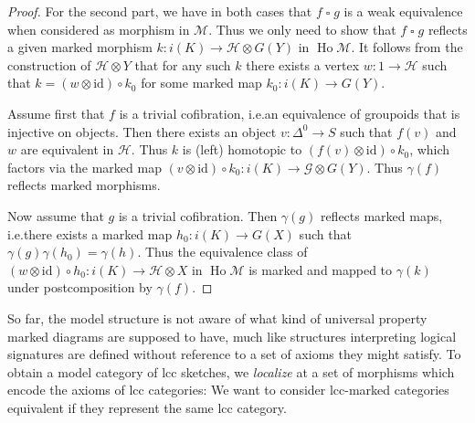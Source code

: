 \documentclass{article}
\theoremstyle{remark}
\theoremstyle{definition}
\begin{document}
\begin{proof}
  For the second part, we have in both cases that $f \mathbin{\square} g$ is a weak equivalence when considered as morphism in $\mathcal{M}$.
  Thus we only need to show that $f \mathbin{\square} g$ reflects a given marked morphism $k : i(K) \rightarrow \mathcal{H} \otimes G(Y)$ in $\operatorname{Ho} \mathcal{M}$.
  It follows from the construction of $\mathcal{H} \otimes Y$ that for any such $k$ there exists a vertex $w : 1 \rightarrow \mathcal{H}$ such that $k = (w \otimes \mathrm{id}) \circ k_0$ for some marked map $k_0 : i(K) \rightarrow G(Y)$.

  Assume first that $f$ is a trivial cofibration, i.e.\@ an equivalence of groupoids that is injective on objects.
  Then there exists an object $v : \Delta^0 \rightarrow S$ such that $f(v)$ and $w$ are equivalent in $\mathcal{H}$.
  Thus $k$ is (left) homotopic to $(f(v) \otimes \mathrm{id}) \circ k_0$, which factors via the marked map $(v \otimes \mathrm{id}) \circ k_0 : i(K) \rightarrow \mathcal{G} \otimes G(Y)$.
  Thus $\gamma(f)$ reflects marked morphisms.

  Now assume that $g$ is a trivial cofibration.
  Then $\gamma(g)$ reflects marked maps, i.e.\@ there exists a marked map $h_0 : i(K) \rightarrow G(X)$ such that $\gamma(g)\gamma(h_0) = \gamma(h)$.
  Thus the equivalence class of $(w \otimes \mathrm{id}) \circ h_0 : i(K) \rightarrow \mathcal{H} \otimes X$ in $\operatorname{Ho} \mathcal{M}$ is marked and mapped to $\gamma(k)$ under postcomposition by $\gamma(f)$.
\end{proof}

So far, the model structure is not aware of what kind of universal property marked diagrams are supposed to have, much like structures interpreting logical signatures are defined without reference to a set of axioms they might satisfy.
To obtain a model category of lcc sketches, we \emph{localize} at a set of morphisms which encode the axioms of lcc categories:
We want to consider lcc-marked categories equivalent if they represent the same lcc category.
\end{document}
